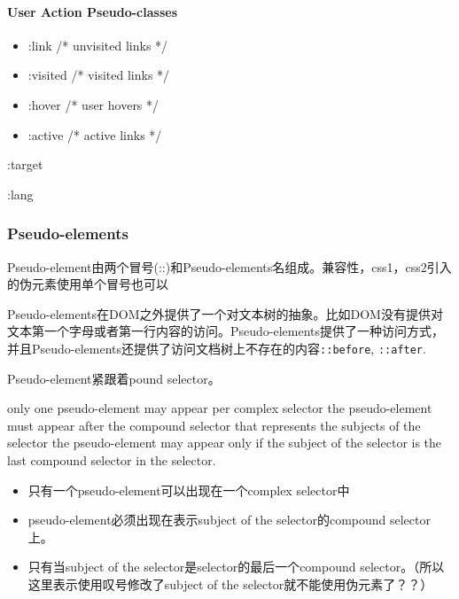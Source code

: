 \paragraph{User Action Pseudo-classes}

\begin{itemize}
\item :link 		/* unvisited links */
\item :visited 		/* visited links */
\item :hover		/* user hovers */
\item :active		/* active links */
\end{itemize}


:target


:lang






\subsubsection{Pseudo-elements}

Pseudo-element由两个冒号(::)和Pseudo-elements名组成。兼容性，css1，css2引入的伪元素使用单个冒号也可以

Pseudo-elements在DOM之外提供了一个对文本树的抽象。比如DOM没有提供对文本第一个字母或者第一行内容的访问。Pseudo-elements提供了一种访问方式，并且Pseudo-elements还提供了访问文档树上不存在的内容\lstinline$::before$, \lstinline$::after$.


Pseudo-element紧跟着pound selector。

only one pseudo-element may appear per complex selector
the pseudo-element must appear after the compound selector that represents the subjects of the selector
the pseudo-element may appear only if the subject of the selector is the last compound selector in the selector.

\begin{itemize}

\item 只有一个pseudo-element可以出现在一个complex selector中

\item pseudo-element必须出现在表示subject of the selector的compound selector上。

\item 只有当subject of the selector是selector的最后一个compound selector。（所以这里表示使用叹号修改了subject of the selector就不能使用伪元素了？？）

\end{itemize}


